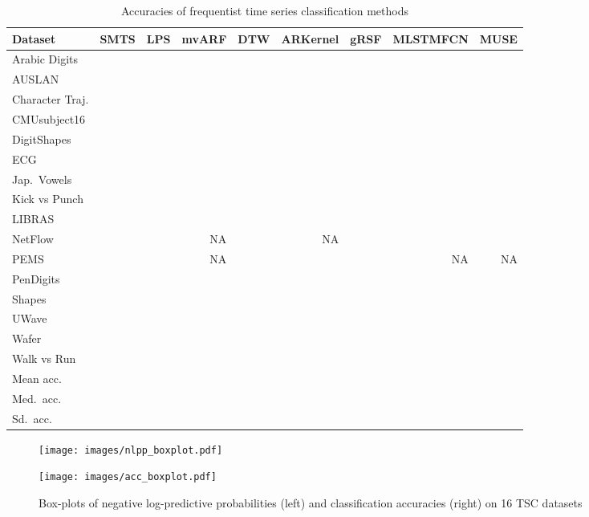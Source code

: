 \documentclass{article}
\begin{document}
\begin{table*}[h]
	\caption{Accuracies of frequentist time series classification methods}
	\label{table:freq_acc_results}
	\vskip 0.15in
	\begin{center}
		\begin{small}
			\begin{sc}
				\begin{tabular}{lrrrrrrrr}\toprule
					Dataset & SMTS & LPS & mvARF & DTW & ARKernel & gRSF & MLSTMFCN & MUSE \\
					\midrule
					Arabic Digits &  &  &  &  &  &  &  &  \\
					AUSLAN &  &  &  &  &  &  &  &  \\
					Character Traj. &  &  &  &  &  &  &  &  \\
					CMUsubject16 &  &  &  &  &  &  &  &  \\
					DigitShapes &  &  &  &  &  &  &  &  \\
					ECG &  &  &  &  &  &  &  &  \\
					Jap.~Vowels &  &  &  &  &  &  &  &  \\
					Kick vs Punch &  &  &  &  &  &  &  &  \\
					LIBRAS &  &  &  &  &  &  &  &  \\
					NetFlow &  &  & NA &  & NA &  &  &  \\
					PEMS &  &  & NA &  &  &  & NA & NA \\
					PenDigits &  &  &  &  &  &  &  &  \\
					Shapes &  &  &  &  &  &  &  &    \\
					UWave &  &  &  &  &  &  &  &  \\
					Wafer &  &  &  &  &  &  &  &  \\
					Walk vs Run &  &  &  &  &  &  &  &  \\
					\midrule
					Mean acc. &  &  &  &  &  &  &  &  \\
                    Med.~acc. &  &  &  &  &  &  &  &  \\
                    Sd.~acc. &  &  &  &  &  &  &  &  \\
					\bottomrule
				\end{tabular}
			\end{sc}
		\end{small}
	\end{center}
\end{table*}

\clearpage

\begin{figure*}[t]
    \centering
    \begin{minipage}{0.29\textwidth}
        \centering
        \texttt{[image: images/nlpp\_boxplot.pdf]}
    \end{minipage}
    \begin{minipage}{0.69\textwidth}
        \centering
        \texttt{[image: images/acc\_boxplot.pdf]}
    \end{minipage}
    \caption{Box-plots of negative log-predictive probabilities (left) and classification accuracies (right) on 16 TSC datasets}
    \label{fig:boxplots}
\end{figure*}

\clearpage
\end{document}

